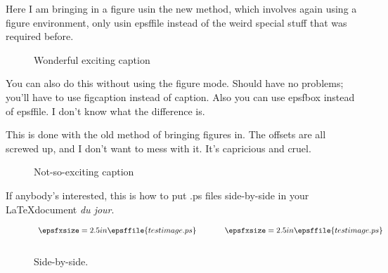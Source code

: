  
\pagestyle{plain}

Here I am bringing in a figure usin the new method, which involves again using
a figure environment, only usin epsffile instead of the weird special stuff that
was required before. 
\begin{figure}[h!]
\begin{center}
\leavevmode
\epsfxsize=3in
\end{center}
\caption{Wonderful exciting caption}
\end{figure}


You can also do this without using the figure mode.  Should have no problems;
you'll have to use figcaption instead of caption.  Also you can use 
epsfbox instead of epsffile.  I don't know what the difference is. 

\clearpage
This is done with the old method of bringing figures in.  The offsets are all
screwed up, and I don't want to mess with it.  It's capricious and cruel. 
\begin{figure}[h]
        \caption{Not-so-exciting caption}
\end{figure}


\clearpage


\noindent If anybody's interested, this is how to put .ps files side-by-side in your 
\LaTeX document {\it du jour}.

\begin{figure}[h]
\begin{center}
$\begin{array}{c@{\hspace{.5in}}c}
\epsfxsize=2.5in
\epsffile{testimage.ps} & 
	\epsfxsize=2.5in
	\epsffile{testimage.ps} \\ [0.4cm]
\end{array}$
\end{center}
\caption{Side-by-side.}
\end{figure}





